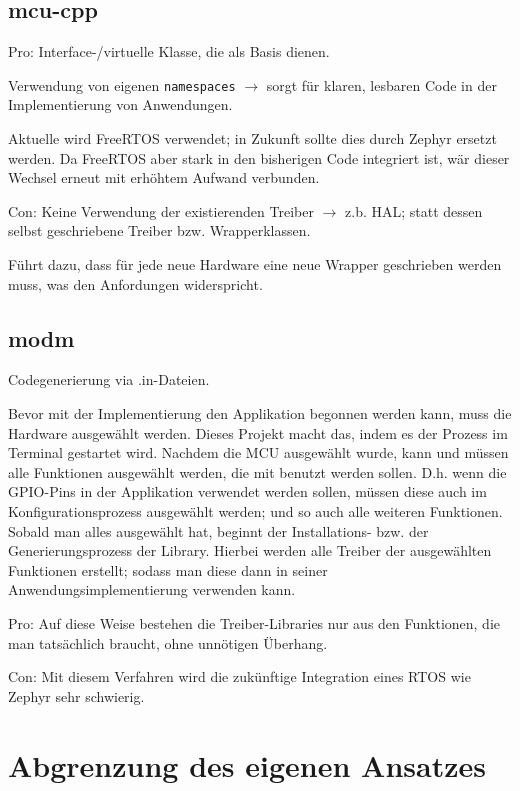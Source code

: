 \subsection{mcu-cpp}
Pro:
Interface-/virtuelle Klasse, die als Basis dienen.

Verwendung von eigenen \texttt{namespaces} $\rightarrow$ sorgt für klaren, lesbaren Code in der Implementierung von Anwendungen.

Aktuelle wird FreeRTOS verwendet; in Zukunft sollte dies durch Zephyr ersetzt werden.
Da FreeRTOS aber stark in den bisherigen Code integriert ist, wär dieser Wechsel erneut mit erhöhtem Aufwand verbunden.



Con:
Keine Verwendung der existierenden Treiber $\rightarrow$ z.b. HAL; statt dessen selbst geschriebene Treiber bzw. Wrapperklassen.

Führt dazu, dass für jede neue Hardware eine neue Wrapper geschrieben werden muss, was den Anfordungen widerspricht.

\subsection{modm}
Codegenerierung via .in-Dateien.

Bevor mit der Implementierung den Applikation begonnen werden kann, muss die Hardware ausgewählt werden.
Dieses Projekt macht das, indem es der Prozess im Terminal gestartet wird.
Nachdem die MCU ausgewählt wurde, kann und müssen alle Funktionen ausgewählt werden, die mit benutzt werden sollen.
D.h. wenn die GPIO-Pins in der Applikation verwendet werden sollen, müssen diese auch im Konfigurationsprozess ausgewählt werden; und so auch alle weiteren Funktionen.
Sobald man alles ausgewählt hat, beginnt der Installations- bzw. der Generierungsprozess der Library. 
Hierbei werden alle Treiber der ausgewählten Funktionen erstellt; sodass man diese dann in seiner Anwendungsimplementierung verwenden kann.

Pro:
Auf diese Weise bestehen die Treiber-Libraries nur aus den Funktionen, die man tatsächlich braucht, ohne unnötigen Überhang.

Con:
Mit diesem Verfahren wird die zukünftige Integration eines RTOS wie Zephyr sehr schwierig.

\section{Abgrenzung des eigenen Ansatzes}



